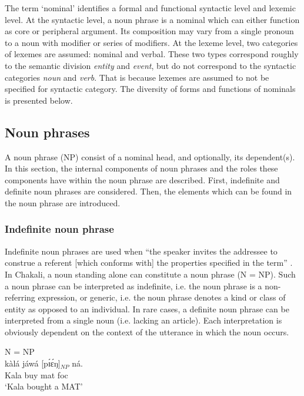 \begin{exe}
\begin{exe}
\begin{exe}
{The term `nominal'  identifies  a formal and functional  syntactic level and
lexemic level. At the syntactic level, a noun phrase is a nominal  which can
either function as core or peripheral argument.  Its composition may
vary from a single pronoun to a noun with modifier or series of
modifiers. At the lexeme level, two categories of lexemes are assumed:
nominal and verbal. These two types correspond roughly to the semantic division
{\it entity} and {\it event}, but do not correspond to the syntactic categories
{\it noun} and {\it verb}. That is because lexemes are assumed to not be
specified for syntactic category. The diversity  of forms and functions of
nominals is presented below. 


\subsection{Noun phrases}
\label{sec:GRM-verb-phrases}

A noun phrase (NP)  consist of a nominal head, and optionally, its dependent(s).
In this section,  the internal components of noun phrases and the roles these
components have within the noun phrase are described. First,   indefinite and
definite noun phrases are considered. Then, the elements which can be found in
the noun phrase are introduced. 

\subsubsection{Indefinite noun phrase}
\label{sec:GRM-np-indef}

Indefinite noun phrases are used when ``the speaker invites the addressee to 
construe a referent [which conforms with] the properties specified in the term'' 
\citep[184]{Dik97}.  In Chakali, a noun standing alone can  constitute a noun 
phrase (N = NP). Such a noun phrase can be interpreted as indefinite, i.e. the 
noun phrase is a non-referring expression,  or   generic, i.e. the noun phrase 
denotes  a kind or class of entity  as opposed to an individual.  In rare cases, 
a definite noun phrase can be interpreted from a single noun  (i.e. lacking  an 
article). Each interpretation is obviously dependent on the context of the 
utterance in which the noun occurs.

\ea\label{GRM-np-type-indef}{\rm  N = NP}\\

 
\ea\label{GRM-np-indef-1}
\gll  kàlá jáwá   [pɪ́ɛ́ŋ]$_{NP}$ ná.\\
  Kala buy mat {\sc foc}\\
\glt  `Kala bought a MAT' 


}
\end{exe}
\end{exe}
\end{exe}
